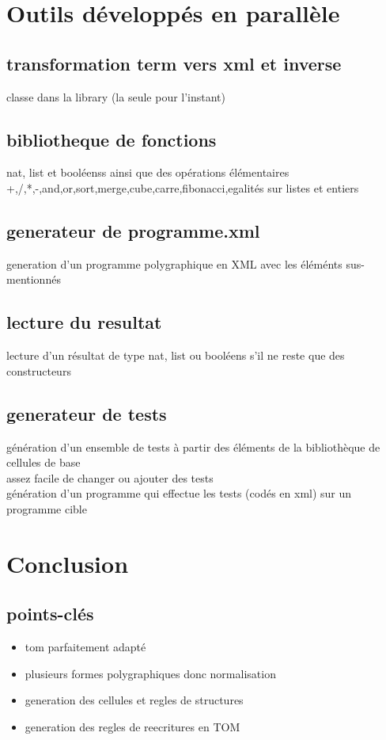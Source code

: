 \documentclass[a4paper,11pt,titlepage]{article}
\begin{document}
{\section{Outils d\'{e}velopp\'{e}s en parall\`{e}le}
\subsection{transformation term vers xml et inverse}
classe dans la library (la seule pour l'instant)
\subsection{bibliotheque de fonctions}
nat, list et bool\'{e}enss ainsi que des op\'{e}rations \'{e}l\'{e}mentaires +,/,*,-,and,or,sort,merge,cube,carre,fibonacci,egalit\'{e}s sur listes et entiers
\subsection{generateur de programme.xml}
generation d'un programme polygraphique en XML avec les \'{e}l\'{e}m\'{e}nts sus-mentionn\'{e}s
\subsection{lecture du resultat}
lecture d'un r\'{e}sultat de type nat, list ou bool\'{e}ens s'il ne reste que des constructeurs
\subsection{generateur de tests}
g\'{e}n\'{e}ration d'un ensemble de tests \`{a} partir des \'{e}l\'{e}ments de la biblioth\`{e}que de cellules de base
\\assez facile de changer ou ajouter des tests
\\g\'{e}n\'{e}ration d'un programme qui effectue les tests (cod\'{e}s en xml) sur un programme cible


\section{Conclusion}
\subsection{points-cl\'{e}s}
\begin{itemize}
\item tom parfaitement adapt\'{e}
\item plusieurs formes polygraphiques donc normalisation
\item generation des cellules et regles de structures
\item generation des regles de reecritures en TOM
\end{itemize}
}
\end{document}
